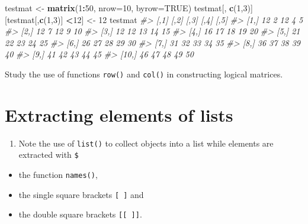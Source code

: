 \documentclass[
]{book}
\newenvironment{Shaded}{\begin{snugshade}}{\end{snugshade}}
\newcommand{\AttributeTok}[1]{\textcolor[rgb]{0.13,0.29,0.53}{#1}}
\newcommand{\CommentTok}[1]{\textcolor[rgb]{0.56,0.35,0.01}{\textit{#1}}}
\newcommand{\ConstantTok}[1]{\textcolor[rgb]{0.56,0.35,0.01}{#1}}
\newcommand{\DecValTok}[1]{\textcolor[rgb]{0.00,0.00,0.81}{#1}}
\newcommand{\FunctionTok}[1]{\textcolor[rgb]{0.13,0.29,0.53}{\textbf{#1}}}
\newcommand{\NormalTok}[1]{#1}
\newcommand{\OtherTok}[1]{\textcolor[rgb]{0.56,0.35,0.01}{#1}}
\newcommand{\SpecialCharTok}[1]{\textcolor[rgb]{0.81,0.36,0.00}{\textbf{#1}}}
\providecommand{\tightlist}{%
  \setlength{\itemsep}{0pt}\setlength{\parskip}{0pt}}
\begin{document}
\begin{Shaded}
\begin{Highlighting}[]
\NormalTok{testmat }\OtherTok{\textless{}{-}} \FunctionTok{matrix}\NormalTok{(}\DecValTok{1}\SpecialCharTok{:}\DecValTok{50}\NormalTok{, }\AttributeTok{nrow=}\DecValTok{10}\NormalTok{, }\AttributeTok{byrow=}\ConstantTok{TRUE}\NormalTok{)}
\NormalTok{testmat[, }\FunctionTok{c}\NormalTok{(}\DecValTok{1}\NormalTok{,}\DecValTok{3}\NormalTok{)][testmat[,}\FunctionTok{c}\NormalTok{(}\DecValTok{1}\NormalTok{,}\DecValTok{3}\NormalTok{)] }\SpecialCharTok{\textless{}}\DecValTok{12}\NormalTok{] }\OtherTok{\textless{}{-}} \DecValTok{12}
\NormalTok{testmat}
\CommentTok{\#\textgreater{}       [,1] [,2] [,3] [,4] [,5]}
\CommentTok{\#\textgreater{}  [1,]   12    2   12    4    5}
\CommentTok{\#\textgreater{}  [2,]   12    7   12    9   10}
\CommentTok{\#\textgreater{}  [3,]   12   12   13   14   15}
\CommentTok{\#\textgreater{}  [4,]   16   17   18   19   20}
\CommentTok{\#\textgreater{}  [5,]   21   22   23   24   25}
\CommentTok{\#\textgreater{}  [6,]   26   27   28   29   30}
\CommentTok{\#\textgreater{}  [7,]   31   32   33   34   35}
\CommentTok{\#\textgreater{}  [8,]   36   37   38   39   40}
\CommentTok{\#\textgreater{}  [9,]   41   42   43   44   45}
\CommentTok{\#\textgreater{} [10,]   46   47   48   49   50}
\end{Highlighting}
\end{Shaded}

Study the use of functions \texttt{row()} and \texttt{col()} in constructing logical matrices.

\section{Extracting elements of lists}\label{extracting-elements-of-lists}

\begin{enumerate}
\def\labelenumi{(\alph{enumi})}
\tightlist
\item
  Note the use of \texttt{list()} to collect objects into a list while elements are extracted with \texttt{\$}
\end{enumerate}

\begin{itemize}
\item
  the function \texttt{names()},
\item
  the single square brackets \texttt{{[}\ {]}} and
\item
  the double square brackets \texttt{{[}{[}\ {]}{]}}.
\end{itemize}
\end{document}
